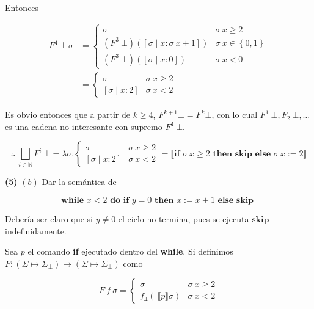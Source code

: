 \documentclass[a4paper, 12pt]{article}
\begin{document}
Entonces

\begin{align*}
  F^4 ~ \bot ~ \sigma 
  &=\begin{cases}
    \sigma & \sigma ~ x \geq 2 \\ 
    (F^3 ~ \bot ) \left( [\sigma \mid x : \sigma ~ x + 1] \right) & \sigma ~ x \in \left\{
    0, 1 \right\} \\
      (F^3 ~ \bot ) \left( [\sigma \mid x : 0] \right) &\sigma ~ x < 0
  \end{cases} \\ 
  &=\begin{cases}
    \sigma & \sigma ~ x \geq 2 \\ 
    [\sigma \mid x : 2] & \sigma ~ x < 2
  \end{cases}
\end{align*}

Es obvio entonces que a partir de $k \geq 4$, $F^{k+1} \bot  = F^k \bot $, con
lo cual $F^1 ~ \bot, F_2 ~ \bot , \ldots$ es una cadena no interesante con
supremo $F^4 ~ \bot $.

\begin{equation*}
  \therefore ~ \bigsqcup_{i \in \mathbb{N}} F^{i} ~ \bot = \lambda \sigma. \begin{cases}
    \sigma & \sigma ~ x \geq 2 \\ 
    [\sigma \mid x : 2] & \sigma ~ x < 2
  \end{cases} = \llbracket \textbf{if } \sigma ~ x \geq 2 \textbf{ then }
  \textbf{skip} \textbf{ else } \sigma ~ x := 2 \rrbracket
\end{equation*}


\pagebreak

\begin{myframe}
  \textbf{(5)} $(b)$ Dar la semántica de 

  $$\textbf{while } x < 2 \textbf{ do } \textbf{if } y = 0 \textbf{ then } x :=
  x+1 \textbf{ else } \textbf{skip }$$
\end{myframe}

Debería ser claro que si $y \neq 0$ el ciclo no termina, pues se ejecuta
$\textbf{skip}$ indefinidamente. 

Sea $p$ el comando \textbf{if} ejecutado dentro del \textbf{while}. Si definimos $F : (\Sigma \mapsto \Sigma_\bot )
\mapsto (\Sigma \mapsto \Sigma_\bot )$ como 

\begin{equation*}
  F ~ f ~ \sigma = \begin{cases}
    \sigma & \sigma ~ x \geq 2 \\ 
    f_{\Bot} \left( ~ \llbracket p \rrbracket \sigma\right) & \sigma ~ x < 2
  \end{cases}
\end{equation*}
\end{document}
